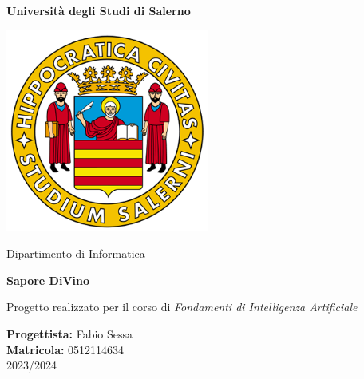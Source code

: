 \documentclass{article}
\begin{document}
\begin{titlepage}
    \begin{center}

        \textbf{\LARGE Università degli Studi di Salerno}

        \vspace{0.5cm}
        
        \includegraphics[width=0.5\textwidth]{unisa.png} 
        
        \vspace{0.3cm}
                
        \large Dipartimento di Informatica
        
        \vspace{3cm}
        
        \Huge \textbf{Sapore DiVino}
        
        \vspace{0.2cm}
        
        \large Progetto realizzato per il corso di \textit {Fondamenti di Intelligenza Artificiale}
        
        \vspace{3.0cm}
        
        \large \textbf{Progettista:} Fabio Sessa \\
        \large \textbf{Matricola:} 0512114634 \\
        \vspace{1.6cm}
        2023/2024
        
        \vspace{2cm}
    \end{center}
        \newpage
        \tableofcontents

        \newpage

\end{titlepage}
\end{document}
